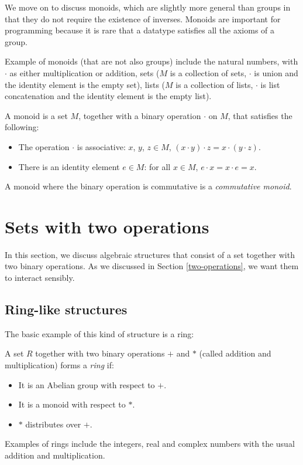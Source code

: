 We move on to discuss monoids, which are slightly more general than groups in that they do not require the existence of inverses. Monoids are important for programming because it is rare that a datatype satisfies all the axioms of a group.

Example of monoids (that are not also groups) include the natural numbers, with $\cdot$ as either multiplication or addition, sets ($M$ is a collection of sets, $\cdot$ is union and the identity element is the empty set), lists ($M$ is a collection of lists, $\cdot$ is list concatenation and the identity element is the empty list).

\begin{Definition}
  A monoid is a set $M$, together with a binary operation $\cdot$ on $M$, that satisfies the following:
  \begin{itemize}
  \item The operation $\cdot$ is associative: $x$, $y$, $z \in M$, $(x \cdot y) \cdot z = x \cdot (y \cdot z)$. 
  \item There is an identity element $e \in M$: for all $x \in M$, $e \cdot x = x \cdot e = x$.
  \end{itemize}
A monoid where the binary operation is commutative is a \emph{commutative monoid}.
\end{Definition}



\section{Sets with two operations}
\label{Set-with-two-op}
In this section, we discuss algebraic structures that consist of a set together with two binary operations. As we discussed in Section \ref{two-operations}, we want them to interact sensibly.
\subsection{Ring-like structures}
The basic example of this kind of structure is a ring:
\begin{Definition}
A set $R$ together with two binary operations $+$ and $*$ (called addition and multiplication) forms a \emph{ring} if:
\begin{itemize}
\item It is an Abelian group with respect to $+$.
\item It is a monoid with respect to $*$.
\item $*$ distributes over $+$.
\end{itemize}
\end{Definition}
Examples of rings include the integers, real and complex numbers with the usual addition and multiplication.

